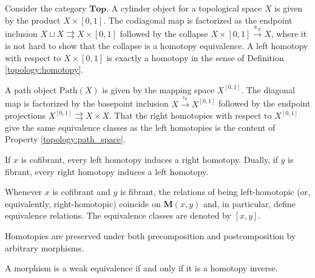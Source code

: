     \begin{example}
        Consider the category $\mathbf{Top}$. A cylinder object for a topological space $X$ is given by the product $X\times[0,1]$. The codiagonal map is factorized as the endpoint inclusion $X\sqcup X\rightrightarrows X\times[0,1]$ followed by the collapse $X\times[0,1]\overset{\pi_X}{\rightarrow}X$, where it is not hard to show that the collapse is a homotopy equivalence. A left homotopy with respect to $X\times[0,1]$ is exactly a homotopy in the sense of Definition \ref{topology:homotopy}.

        A path object $\mathrm{Path}(X)$ is given by the mapping space $X^{[0,1]}$. The diagonal map is factorized by the basepoint inclusion $X\overset{\iota_0}{\rightarrow}X^{[0,1]}$ followed by the endpoint projections $X^{[0,1]}\rightrightarrows X\times X$. That the right homotopies with respect to $X^{[0,1]}$ give the same equivalence classes as the left homotopies is the content of Property \ref{topology:path_space}.
    \end{example}

    \begin{property}
        If $x$ is cofibrant, every left homotopy induces a right homotopy. Dually, if $y$ is fibrant, every right homotopy induces a left homotopy.
    \end{property}
    \begin{result}
        Whenever $x$ is cofibrant and $y$ is fibrant, the relations of being left-homotopic (or, equivalently, right-homotopic) coincide on $\mathbf{M}(x,y)$ and, in particular, define equivalence relations. The equivalence classes are denoted by $[x,y]$.
    \end{result}

    \begin{property}
        Homotopies are preserved under both precomposition and postcomposition by arbitrary morphisms.
    \end{property}
    \begin{property}\label{model:weak_equivalence_homotopy}
        A morphism is a weak equivalence if and only if it is a homotopy inverse.
    \end{property}


